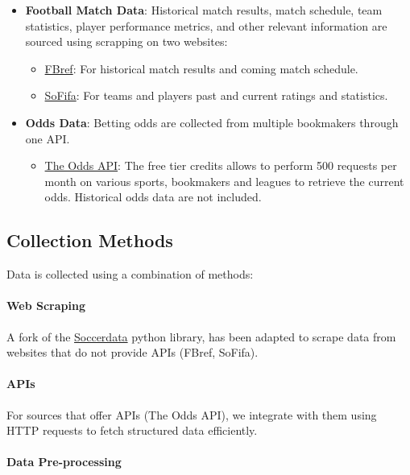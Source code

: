\begin{itemize}
    \item \textbf{Football Match Data}: Historical match results, match schedule, team statistics, player performance metrics, and other relevant information are sourced using scrapping on two websites: 
    \begin{itemize}
        \item \hyperlink{https://fbref.com/en/}{FBref}: For historical match results and coming match schedule.
        \item \hyperlink{https://sofifa.com/}{SoFifa}: For teams and players past and current ratings and statistics.
    \end{itemize}
    \item \textbf{Odds Data}: Betting odds are collected from multiple bookmakers through one API.
    \begin{itemize}
        \item \hyperlink{https://the-odds-api.com/}{The Odds API}: The free tier credits allows to perform 500 requests per month on various sports, bookmakers and leagues to retrieve the current odds. Historical odds data are not included.
    \end{itemize}
\end{itemize}


\subsection{Collection Methods}

Data is collected using a combination of methods:

\paragraph{Web Scraping}

A fork of the \hyperlink{https://soccerdata.readthedocs.io/en/latest/}{Soccerdata} python library, has been adapted to scrape data from websites that do not provide APIs (FBref, SoFifa). 

\paragraph{APIs}

For sources that offer APIs (The Odds API), we integrate with them using HTTP requests to fetch structured data efficiently.

\paragraph{Data Pre-processing}

